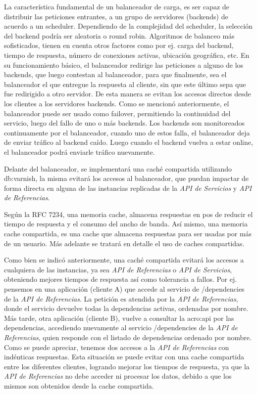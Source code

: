 La característica fundamental de un balanceador de carga, es ser capaz de distribuir las peticiones entrantes, a un grupo de servidores (backends) de acuerdo a un scheduler.  Dependiendo de la complejidad del scheduler, la selección del backend podría ser aleatoria o round robin.  Algoritmos de balanceo más sofisticados, tienen en cuenta otros factores como por ej. carga del backend, tiempo de respuesta, número de conexiones activas, ubicación geográfica, etc.
En su funcionamiento básico, el balanceador redirige las peticiones a alguno de los backends, que luego contestan al balanceador, para que finalmente, sea el balanceador el que entregue la respuesta al cliente, sin que este último sepa que fue redirigido a otro servidor.  De esta manera se evitan los accesos directos desde los clientes a los servidores backends.
Como se mencionó anteriormente, el balanceador puede ser usado como failover, permitiendo la continuidad del servicio, luego del fallo de uno o más backends.  Los backends son monitoreados continuamente por el balanceador, cuando uno de estos falla, el balanceador deja de enviar tráfico al backend caído.  Luego cuando el backend vuelva a estar online, el balanceador podrá enviarle tráfico nuevamente.

Delante del balanceador, se implementará una caché compartida utilizando \gls{db:varnish}, la misma evitará los accesos al balanceador, que puedan impactar de forma directa en alguna de las instancias replicadas de la \textit{API de Servicios} y \textit{API de Referencias}.

Según la RFC 7234, una memoria cache, almacena respuestas en pos de reducir el tiempo de respuesta y el consumo del ancho de banda. Así mismo, una memoria cache compartida, es una cache que almacena respuestas para ser usadas por más de un usuario. Más adelante se tratará en detalle el uso de caches compartidas.

Como bien se indicó anteriormente, una caché compartida evitará los accesos a cualquiera de las instancias, ya sea \textit{API de Referencias} o \textit{API de Servicios}, obteniendo mejores tiempos de respuesta así como tolerancia a fallos.  Por ej. pensemos en una aplicación (cliente A) que accede al servicio de /dependencies de la \textit{API de Referencias}.  La petición es atendida por la \textit{API de Referencias}, donde el servicio devuelve todas la dependencias activas, ordenadas por nombre.  Más tarde, otra aplicación (cliente B), vuelve a consultar la \gls{acro:api} por las dependencias, accediendo nuevamente al servicio /dependencies de la \textit{API de Referencias}, quien responde con el listado de dependencias ordenado por nombre.  Como se puede apreciar, tenemos dos accesos a la \textit{API de Referencias} con indénticas respuestas.  Esta situación se puede evitar con una cache compartida entre los diferentes clientes, logrando mejorar los tiempos de respuesta, ya que la \textit{API de Referencias} no debe acceder ni procesar los datos, debido a que los mismos son obtenidos desde la cache compartida.


